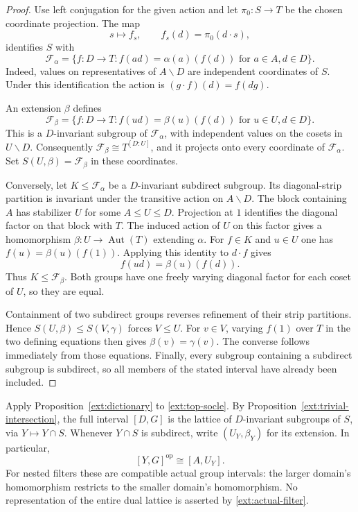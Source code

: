 \begin{proof}
Use left conjugation for the given action and let $\pi_0:S\to T$ be
the chosen coordinate projection.  The map
\[
 s\longmapsto f_s,\qquad f_s(d)=\pi_0(d\cdot s),
\]
identifies $S$ with
\[
 \mathcal F_\alpha
 =\{f:D\to T:f(ad)=\alpha(a)(f(d))
                       \text{ for }a\in A,d\in D\}.
\]
Indeed, values on representatives of $A\backslash D$ are independent
coordinates of $S$.  Under this identification the action is
$(g\cdot f)(d)=f(dg)$.

An extension $\beta$ defines
\[
 \mathcal F_\beta
 =\{f:D\to T:f(ud)=\beta(u)(f(d))
                       \text{ for }u\in U,d\in D\}.
\]
This is a $D$-invariant subgroup of $\mathcal F_\alpha$, with independent
values on the cosets in $U\backslash D$.  Consequently
$\mathcal F_\beta\cong T^{[D:U]}$, and it projects onto every coordinate
of $\mathcal F_\alpha$.  Set $S(U,\beta)=\mathcal F_\beta$ in these
coordinates.

Conversely, let $K\le\mathcal F_\alpha$ be a $D$-invariant subdirect
subgroup.  Its diagonal-strip partition is invariant under the
transitive action on $A\backslash D$.  The block containing $A$ has
stabilizer $U$ for some $A\le U\le D$.  Projection at $1$ identifies
the diagonal factor on that block with $T$.  The induced action of $U$
on this factor gives a homomorphism
$\beta:U\to\operatorname{Aut}(T)$ extending $\alpha$.
For $f\in K$ and $u\in U$ one has $f(u)=\beta(u)(f(1))$.
Applying this identity to $d\cdot f$ gives
\[
                     f(ud)=\beta(u)(f(d)).
\]
Thus $K\le\mathcal F_\beta$.  Both groups have one freely varying
diagonal factor for each coset of $U$, so they are equal.

Containment of two subdirect groups reverses refinement of their strip
partitions.  Hence $S(U,\beta)\le S(V,\gamma)$ forces $V\le U$.
For $v\in V$, varying $f(1)$ over $T$ in the two defining equations
then gives $\beta(v)=\gamma(v)$.  The converse follows immediately
from those equations.  Finally, every subgroup containing a subdirect
subgroup is subdirect, so all members of the stated interval have
already been included.
\end{proof}

Apply Proposition~\ref{ext:dictionary} to
\eqref{ext:top-socle}.  By Proposition~\ref{ext:trivial-intersection},
the full interval $[D,G]$ is the lattice of $D$-invariant subgroups of
$S$, via $Y\mapsto Y\cap S$.  Whenever $Y\cap S$ is subdirect, write
$(U_Y,\beta_Y)$ for its extension.  In particular,
\begin{equation}\label{ext:actual-filter}
                  [Y,G]^{\mathrm{op}}\cong[A,U_Y].
\end{equation}
For nested filters these are compatible actual group intervals: the
larger domain's homomorphism restricts to the smaller domain's
homomorphism.  No representation of the entire dual lattice is asserted
by \eqref{ext:actual-filter}.

